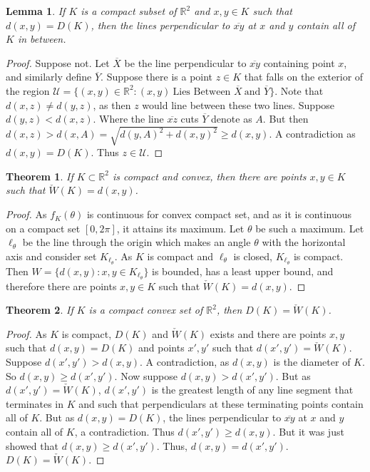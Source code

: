 \documentclass[oneside]{book}
\theoremstyle{mystyle}
\newtheorem{theorem}{Theorem}[section]
\newtheorem{lemma}{Lemma}[section]
\begin{document}
\begin{lemma}
If $K$ is a compact subset of $\mathbb{R}^2$ and $x,y\in K$ such that $d(x,y)=D(K)$, then the lines perpendicular to $\overline{xy}$ at $x$ and $y$ contain all of $K$ in between.
\end{lemma}
\begin{proof}
Suppose not. Let $\overline{X}$ be the line perpendicular to $\overline{xy}$ containing point $x$, and similarly define $\overline{Y}$. Suppose there is a point $z\in K$ that falls on the exterior of the region $\mathcal{U} = \{(x,y)\in \mathbb{R}^2: (x,y)\ \textrm{Lies Between } \overline{X}\ \textrm{and } \overline{Y}\}$. Note that $d(x,z)\ne d(y,z)$, as then $z$ would line between these two lines. Suppose $d(y,z)<d(x,z)$. Where the line $\overline{xz}$ cuts $\overline{Y}$ denote as $A$. But then $d(x,z) > d(x,A) = \sqrt{d(y,A)^2+d(x,y)^2}\geq d(x,y)$. A contradiction as $d(x,y) = D(K)$. Thus $z\in \mathcal{U}$.
\end{proof}

\begin{theorem}
If $K\subset \mathbb{R}^2$ is compact and convex, then there are points $x,y\in K$ such that $\check{W}(K)=d(x,y)$.
\end{theorem}
\begin{proof}
As $f_K(\theta)$ is continuous for convex compact set, and as it is continuous on a compact set $[0,2\pi]$, it attains its maximum. Let $\theta$ be such a maximum. Let $\ell_{\theta}$ be the line through the origin which makes an angle $\theta$ with the horizontal axis and consider set $K_{\ell_{\theta}}$. As $K$ is compact and $\ell_{\theta}$ is closed, $K_{\ell_{\theta}}$ is compact. Then $W=\{d(x,y):x,y\in K_{\ell_{\theta}}\}$ is bounded, has a least upper bound, and therefore there are points $x,y \in K$ such that $\check{W}(K)=d(x,y)$.
\end{proof}

\begin{theorem}
If $K$ is a compact convex set of $\mathbb{R}^2$, then $D(K) = \check{W}(K)$.
\end{theorem}
\begin{proof}
As $K$ is compact, $D(K)$ and $\check{W}(K)$ exists and there are points $x,y$ such that $d(x,y) = D(K)$ and points $x',y'$ such that $d(x',y') = \check{W}(K)$. Suppose $d(x',y')> d(x,y)$. A contradiction, as $d(x,y)$ is the diameter of $K$. So $d(x,y) \geq d(x',y')$. Now suppose $d(x,y)>d(x',y')$. But as $d(x',y')= \check{W}(K)$, $d(x',y')$ is the greatest length of any line segment that terminates in $K$ and such that perpendiculars at these terminating points contain all of $K$. But as $d(x,y)=D(K)$, the lines perpendicular to $\overline{xy}$ at $x$ and $y$ contain all of $K$, a contradiction. Thus $d(x',y') \geq d(x,y)$. But it was just showed that $d(x,y)\geq d(x',y')$. Thus, $d(x,y) = d(x',y')$. $D(K) = \check{W}(K)$.
\end{proof}
\end{document}
